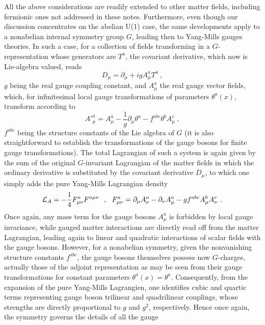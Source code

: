 \documentclass[a4paper,11pt]{article}
\begin{document}
All the above considerations are readily extended to other matter fields,
including fermionic ones not addressed in these notes. Furthermore,
even though our discussion concentrates on the abelian U(1) case,
the same de\-ve\-lop\-ments apply to a nonabelian internal symmetry group $G$,
leading then to Yang-Mills gauges theories. In such a case, for a
collection of fields trans\-for\-ming in a $G$-representation whose generators
are $T^a$, the covariant derivative, which now is Lie-algebra valued, reads
\begin{equation}
D_\mu=\partial_\mu+igA^a_\mu T^a\ ,
\end{equation}
$g$ being the real gauge coupling constant, and $A^a_\mu$ the real gauge
vector fields, which, for infinitesimal local gauge transformations of
parameters $\theta^a(x)$, transform according to
\begin{equation}
{A'}^a_\mu=A^a_\mu-\frac{1}{g}\partial_\mu\theta^a-
f^{abc}\theta^bA^c_\mu\ ,
\end{equation}
$f^{abc}$ being the structure constants of the Lie algebra of $G$
(it is also straightforward to establish the transformations of the gauge
bosons for finite gauge transformations). 
The total Lagrangian of such a system is again given by the sum of the
original $G$-invariant Lagrangian of the matter fields in which the ordinary 
derivative is substituted by the covariant derivative $D_\mu$, to which one 
simply adds the pure Yang-Mills Lagrangian density
\begin{equation}
{\cal L}_A=-\frac{1}{4}F^a_{\mu\nu}F^{a\mu\nu}\ \ ,\ \ 
F^a_{\mu\nu}=\partial_\mu A^a_\nu-\partial_\nu A^a_\mu-
gf^{abc}A^b_\mu A^c_\nu\ .
\end{equation}
Once again, any mass term for the gauge bosons $A^a_\mu$ is forbidden by
local gauge invariance, while gauged matter interactions are directly
read off from the matter Lagrangian, leading again to linear and quadratic
interactions of scalar fields with the gauge bosons. However, for a nonabelian
symmetry, given the nonvanishing structure constants $f^{abc}$, the gauge
bosons themselves possess now $G$-charges, actually those of the adjoint
representation as may be seen from their gauge transformations for constant
parameters $\theta^a(x)=\theta^a$. Consequently, from the expansion of
the pure Yang-Mills Lagrangien, one identifies cubic and quartic terms
representing gauge boson trilinear and quadrilinear couplings, whose
strengths are directly proportional to $g$ and $g^2$, respectively.
Hence once again, the symmetry governs the details of all the gauge
\end{document}
